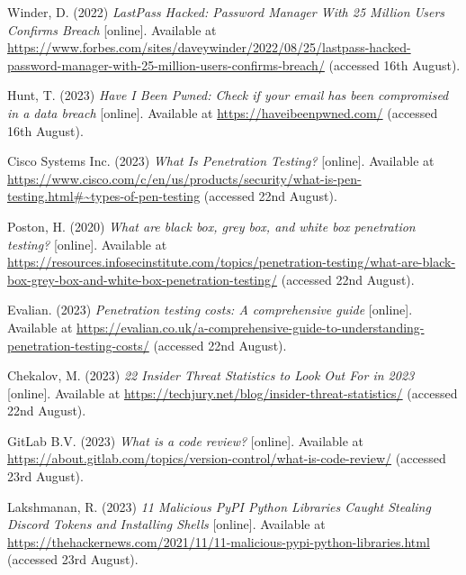  \noindent [43] Winder, D. (2022) \textit{LastPass Hacked: Password Manager With 25 Million Users Confirms Breach} [online]. Available at \url{https://www.forbes.com/sites/daveywinder/2022/08/25/lastpass-hacked-password-manager-with-25-million-users-confirms-breach/} (accessed 16th August).
 \vspace{0.2cm}

 \noindent [44] Hunt, T. (2023) \textit{Have I Been Pwned: Check if your email has been compromised in a data breach} [online]. Available at \url{https://haveibeenpwned.com/} (accessed 16th August).
 \vspace{0.2cm}

 \noindent [45] Cisco Systems Inc. (2023) \textit{What Is Penetration Testing?} [online]. Available at \url{https://www.cisco.com/c/en/us/products/security/what-is-pen-testing.html#~types-of-pen-testing} (accessed 22nd August).
 \vspace{0.2cm}

 \noindent [46] Poston, H. (2020) \textit{What are black box, grey box, and white box penetration testing?} [online]. Available at \url{https://resources.infosecinstitute.com/topics/penetration-testing/what-are-black-box-grey-box-and-white-box-penetration-testing/} (accessed 22nd August).
 \vspace{0.2cm}

 \noindent [47] Evalian. (2023) \textit{Penetration testing costs: A comprehensive guide} [online]. Available at \url{https://evalian.co.uk/a-comprehensive-guide-to-understanding-penetration-testing-costs/} (accessed 22nd August).
 \vspace{0.2cm}

 \noindent [48] Chekalov, M. (2023) \textit{22 Insider Threat Statistics to Look Out For in 2023} [online]. Available at \url{https://techjury.net/blog/insider-threat-statistics/} (accessed 22nd August).
 \vspace{0.2cm}

 \noindent [49] GitLab B.V. (2023) \textit{What is a code review?} [online]. Available at \url{https://about.gitlab.com/topics/version-control/what-is-code-review/} (accessed 23rd August).
 \vspace{0.2cm}

 \noindent [50] Lakshmanan, R. (2023) \textit{11 Malicious PyPI Python Libraries Caught Stealing Discord Tokens and Installing Shells} [online]. Available at \url{https://thehackernews.com/2021/11/11-malicious-pypi-python-libraries.html} (accessed 23rd August).
 \vspace{0.2cm}

